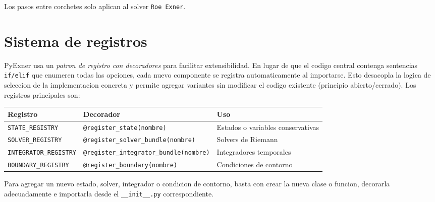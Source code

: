 \documentclass[11pt,a4paper]{article}
\newcommand{\code}[1]{\texttt{#1}}
\begin{document}
Los pasos entre corchetes solo aplican al solver \code{Roe Exner}.

\section{Sistema de registros}

PyExner usa un \emph{patron de registro con decoradores} para facilitar extensibilidad. En lugar
de que el codigo central contenga sentencias \code{if/elif} que enumeren todas las opciones, cada
nuevo componente se registra automaticamente al importarse. Esto desacopla la logica de seleccion
de la implementacion concreta y permite agregar variantes sin modificar el codigo existente
(principio abierto/cerrado). Los registros principales son:

{\footnotesize
\begin{tabularx}{\textwidth}{L{3.2cm}L{6cm}Y}
\toprule
Registro & Decorador & Uso \\
\midrule
\code{STATE\_REGISTRY} & \code{@register\_state(nombre)} & Estados o variables conservativas \\
\code{SOLVER\_REGISTRY} & \code{@register\_solver\_bundle(nombre)} & Solvers de Riemann \\
\code{INTEGRATOR\_REGISTRY} & \code{@register\_integrator\_bundle(nombre)} & Integradores temporales \\
\code{BOUNDARY\_REGISTRY} & \code{@register\_boundary(nombre)} & Condiciones de contorno \\
\bottomrule
\end{tabularx}
}

Para agregar un nuevo estado, solver, integrador o condicion de contorno, basta con crear la nueva
clase o funcion, decorarla adecuadamente e importarla desde el \code{\_\_init\_\_.py} correspondiente.
\end{document}
